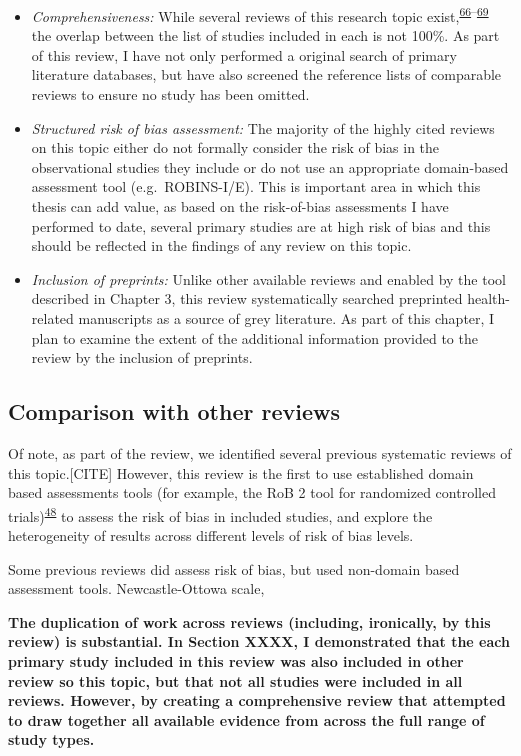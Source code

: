 \documentclass[a4paper, twoside]{templates/ociamthesis}
\providecommand{\tightlist}{%
  \setlength{\itemsep}{0pt}\setlength{\parskip}{0pt}}
\begin{document}
\begin{itemize}
\tightlist
\item
  \emph{Comprehensiveness:} While several reviews of this research topic exist,\textsuperscript{\protect\hyperlink{ref-chu2018b}{66}--\protect\hyperlink{ref-poly2020b}{69}} the overlap between the list of studies included in each is not 100\%. As part of this review, I have not only performed a original search of primary literature databases, but have also screened the reference lists of comparable reviews to ensure no study has been omitted.
\item
  \emph{Structured risk of bias assessment:} The majority of the highly cited reviews on this topic either do not formally consider the risk of bias in the observational studies they include or do not use an appropriate domain-based assessment tool (e.g.~ROBINS-I/E). This is important area in which this thesis can add value, as based on the risk-of-bias assessments I have performed to date, several primary studies are at high risk of bias and this should be reflected in the findings of any review on this topic.
\item
  \emph{Inclusion of preprints:} Unlike other available reviews and enabled by the tool described in Chapter 3, this review systematically searched preprinted health-related manuscripts as a source of grey literature. As part of this chapter, I plan to examine the extent of the additional information provided to the review by the inclusion of preprints.
\end{itemize}

\hypertarget{comparison-with-other-reviews}{%
\subsection{Comparison with other reviews}\label{comparison-with-other-reviews}}

Of note, as part of the review, we identified several previous systematic reviews of this topic.{[}CITE{]} However, this review is the first to use established domain based assessments tools (for example, the RoB 2 tool for randomized controlled trials)\textsuperscript{\protect\hyperlink{ref-sterne2019}{48}} to assess the risk of bias in included studies, and explore the heterogeneity of results across different levels of risk of bias levels.

Some previous reviews did assess risk of bias, but used non-domain based assessment tools. Newcastle-Ottowa scale,

\textbf{The duplication of work across reviews (including, ironically, by this review) is substantial. In Section XXXX, I demonstrated that the each primary study included in this review was also included in other review so this topic, but that not all studies were included in all reviews. However, by creating a comprehensive review that attempted to draw together all available evidence from across the full range of study types.}
\end{document}
